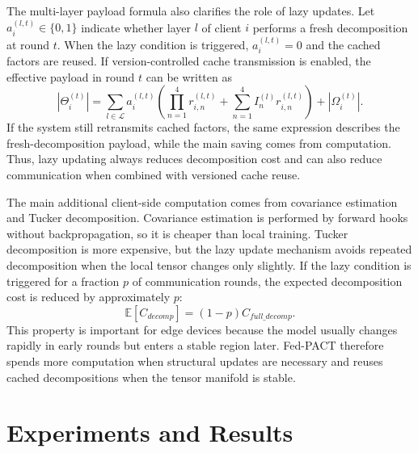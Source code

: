 \documentclass[conference]{IEEEtran}
\begin{document}
The multi-layer payload formula also clarifies the role of lazy updates. Let $a_i^{(l,t)}\in\{0,1\}$ indicate whether layer $l$ of client $i$ performs a fresh decomposition at round $t$. When the lazy condition is triggered, $a_i^{(l,t)}=0$ and the cached factors are reused. If version-controlled cache transmission is enabled, the effective payload in round $t$ can be written as
\begin{equation}
    |\Theta_i^{(t)}|=
    \sum_{l\in \mathcal{L}}a_i^{(l,t)}
    \left(
    \prod_{n=1}^{4} r_{i,n}^{(l,t)}
    +
    \sum_{n=1}^{4} I_{n}^{(l)} r_{i,n}^{(l,t)}
    \right)
    +
    |\Omega_i^{(t)}|.
    \label{eq:lazy_multilayer_payload}
\end{equation}
If the system still retransmits cached factors, the same expression describes the fresh-decomposition payload, while the main saving comes from computation. Thus, lazy updating always reduces decomposition cost and can also reduce communication when combined with versioned cache reuse.

The main additional client-side computation comes from covariance estimation and Tucker decomposition. Covariance estimation is performed by forward hooks without backpropagation, so it is cheaper than local training. Tucker decomposition is more expensive, but the lazy update mechanism avoids repeated decomposition when the local tensor changes only slightly. If the lazy condition is triggered for a fraction $p$ of communication rounds, the expected decomposition cost is reduced by approximately $p$:
\begin{equation}
    \mathbb{E}[C_{decomp}]=(1-p)C_{full\_decomp}.
\end{equation}
This property is important for edge devices because the model usually changes rapidly in early rounds but enters a stable region later. Fed-PACT therefore spends more computation when structural updates are necessary and reuses cached decompositions when the tensor manifold is stable.

\section{Experiments and Results}
\end{document}
